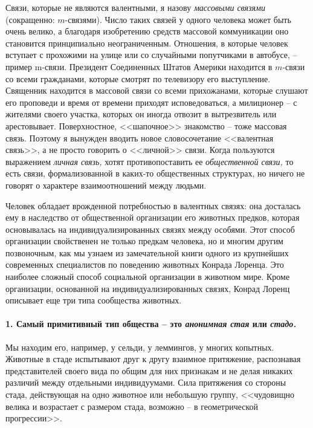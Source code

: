 \documentclass{book}
\begin{document}
Связи, которые не являются валентными, я назову \textit{массовы­ми связями}  (сокращенно: $m$-связями). Число таких связей у 
одного человека может быть очень велико, а благодаря изоб­ретению средств массовой коммуникации оно становится принципиально 
неограниченным. Отношения, в которые чело­век вступает с прохожими на улице или со случайными попут­чиками в автобусе, -- пример 
m-связи. Президент Соединенных Штатов Америки находится в $m$-связи со всеми гражданами, которые смотрят по телевизору его 
выступление. Священник находится в массовой связи со всеми прихожанами, которые слушают его проповеди и время от времени 
приходят испове­доваться, а милиционер -- с жителями своего участка, которых он иногда отвозит в вытрезвитель или арестовывает. 
Поверх­ностное, <<шапочное>> знакомство -- тоже массовая связь. Поэтому я вынужден вводить новое словосочетание <<валентная 
связь>>, а не просто говорить о <<личной>> связи. Когда пользуют­ся выражением \textit{личная связь,}  хотят противопоставить ее 
\textit{об­щественной связи,}  то есть связи, формализованной в каких-то общественных структурах, но ничего не говорят о 
характере взаимоотношений между людьми.

Человек обладает врожденной потребностью в валентных связях: она досталась ему в наследство от общественной ор­ганизации его 
животных предков, которая основывалась на индивидуализированных связях между особями. Этот способ организации свойственен не 
только предкам человека, но и мно­гим другим позвоночным, как мы узнаем из замечательной книги одного из крупнейших современных 
специалистов по по­ведению животных Конрада Лоренца.%
Это наиболее сложный способ социальной организации в животном мире. 
Кроме организации, основанной на индивидуализированных связях, Конрад Лоренц описывает еще три типа сообщества животных.

\paragraph{1. Самый примитивный тип общества -- это \textit{анонимная стая} или \textit{стадо.}}  Мы находим его, например, у 
сельди, у леммингов, у многих копытных. Животные в стаде испытывают друг к другу взаимное притяжение, распознавая представителей 
своего вида по общим для них признакам и не делая никаких разли­чий между отдельными индивидуумами. Сила притяжения со стороны 
стада, действующая на одно животное или неболь­шую группу, <<чудовищно велика и возрастает с размером стада, возможно -- в 
геометрической прогрессии>>.%
\end{document}
